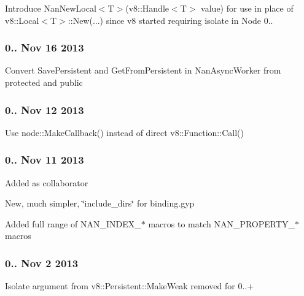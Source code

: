 \begin{DoxyItemize}
\item Introduce Nan\+New\+Local$<$\+T$>$(v8\+::\+Handle$<$\+T$>$ value) for use in place of v8\+::\+Local$<$\+T$>$\+::\+New(...) since v8 started requiring isolate in Node 0..
\end{DoxyItemize}

\subsubsection*{0.. Nov 16 2013}


\begin{DoxyItemize}
\item Convert Save\+Persistent and Get\+From\+Persistent in Nan\+Async\+Worker from protected and public
\end{DoxyItemize}

\subsubsection*{0.. Nov 12 2013}


\begin{DoxyItemize}
\item Use node\+::\+Make\+Callback() instead of direct v8\+::\+Function\+::\+Call()
\end{DoxyItemize}

\subsubsection*{0.. Nov 11 2013}


\begin{DoxyItemize}
\item Added  as collaborator
\item New, much simpler, \char`\"{}include\+\_\+dirs\char`\"{} for binding.\+gyp
\item Added full range of N\+A\+N\+\_\+\+I\+N\+D\+E\+X\+\_\+$\ast$ macros to match N\+A\+N\+\_\+\+P\+R\+O\+P\+E\+R\+T\+Y\+\_\+$\ast$ macros
\end{DoxyItemize}

\subsubsection*{0.. Nov 2 2013}


\begin{DoxyItemize}
\item Isolate argument from v8\+::\+Persistent\+::\+Make\+Weak removed for 0..+
\end{DoxyItemize}

